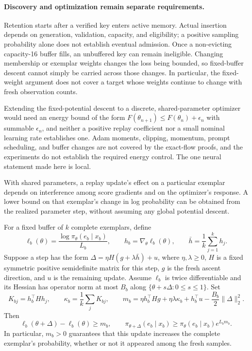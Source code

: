 \paragraph{Discovery and optimization remain separate requirements.}
Retention starts after a verified key enters active memory. Actual insertion
depends on generation, validation, capacity, and eligibility; a positive
sampling probability alone does not establish eventual admission. Once a
non-evicting capacity-16 buffer fills, an unbuffered key can remain ineligible.
Changing membership or exemplar weights changes the loss being bounded, so
fixed-buffer descent cannot simply be carried across those changes. In
particular, the fixed-weight argument does not cover a target whose weights
continue to change with fresh observation counts.

Extending the fixed-potential descent to a discrete, shared-parameter
optimizer would need an energy bound of the form
$F(\theta_{n+1})\le F(\theta_n)+\epsilon_n$ with summable $\epsilon_n$, and
neither a positive replay coefficient nor a small nominal learning rate
establishes one. Adam moments, clipping, momentum, prompt scheduling, and
buffer changes are not covered by the exact-flow proofs, and the experiments
do not establish the required energy control. The one neural statement made
here is local.

With shared parameters, a replay update's effect on a particular exemplar
depends on interference among score gradients and on the optimizer's
response. A lower bound on that exemplar's change in log probability can be
obtained from the realized parameter step, without assuming any global
potential descent.

\begin{proposition}
\enforcehalffinalproseline
\label{prop:neural-replay-local-response}
For a fixed buffer of $k$ complete exemplars, define
\[
 \ell_b(\theta)=\frac{\log\pi_\theta(e_b\mid x_b)}{L_b},\qquad
 h_b=\nabla_\theta\ell_b(\theta),\qquad
 \bar h=\frac1k\sum_{j=1}^k h_j.
\]
Suppose a step has the form
$\Delta=\eta H(g+\lambda\bar h)+u$, where $\eta,\lambda\ge0$,
$H$ is a fixed symmetric positive semidefinite matrix for this step,
$g$ is the fresh ascent direction, and $u$ is the remaining update.
Assume $\ell_b$ is twice differentiable and its Hessian has operator norm
at most $B_b$ along $\{\theta+s\Delta:0\le s\le1\}$.
Set
\[
 K_{bj}=h_b^\top Hh_j,\qquad
 \kappa_b=\frac1k\sum_jK_{bj},\qquad
 m_b=\eta h_b^\top Hg+\eta\lambda\kappa_b
       +h_b^\top u-\frac{B_b}{2}\|\Delta\|_2^2.
\]
Then
\begin{equation}
 \ell_b(\theta+\Delta)-\ell_b(\theta)\ge m_b,
 \qquad
 \pi_{\theta+\Delta}(e_b\mid x_b)
    \ge\pi_\theta(e_b\mid x_b)e^{L_bm_b}.
 \label{eq:neural-replay-local-response}
\end{equation}
In particular, $m_b>0$ guarantees that this update increases the complete
exemplar's probability, whether or not it appeared among the fresh samples.
\end{proposition}

